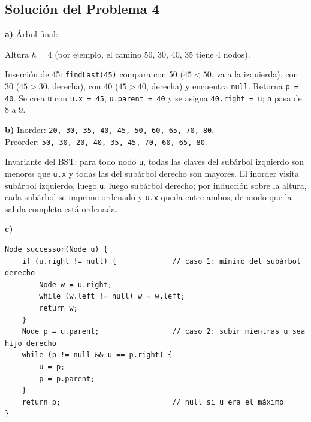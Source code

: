 \documentclass[11pt,a4paper]{article}
\begin{document}
\newpage
\subsection*{Solución del Problema 4}

\textbf{a)} Árbol final:

\begin{center}
\end{center}

Altura $h = 4$ (por ejemplo, el camino 50, 30, 40, 35 tiene 4 nodos).

Inserción de 45: \texttt{findLast(45)} compara con 50 ($45 < 50$, va a la izquierda), con 30 ($45 > 30$, derecha), con 40 ($45 > 40$, derecha) y encuentra \texttt{null}. Retorna \texttt{p = 40}. Se crea \texttt{u} con \texttt{u.x = 45}, \texttt{u.parent = 40} y se asigna \texttt{40.right = u}; \texttt{n} pasa de 8 a 9.

\textbf{b)} Inorder: \texttt{20, 30, 35, 40, 45, 50, 60, 65, 70, 80}.\\
Preorder: \texttt{50, 30, 20, 40, 35, 45, 70, 60, 65, 80}.

Invariante del BST: para todo nodo \texttt{u}, todas las claves del subárbol izquierdo son menores que \texttt{u.x} y todas las del subárbol derecho son mayores. El inorder visita subárbol izquierdo, luego \texttt{u}, luego subárbol derecho; por inducción sobre la altura, cada subárbol se imprime ordenado y \texttt{u.x} queda entre ambos, de modo que la salida completa está ordenada.

\textbf{c)}
\begin{lstlisting}
Node successor(Node u) {
    if (u.right != null) {             // caso 1: mínimo del subárbol derecho
        Node w = u.right;
        while (w.left != null) w = w.left;
        return w;
    }
    Node p = u.parent;                 // caso 2: subir mientras u sea hijo derecho
    while (p != null && u == p.right) {
        u = p;
        p = p.parent;
    }
    return p;                          // null si u era el máximo
}
\end{lstlisting}
\end{document}
